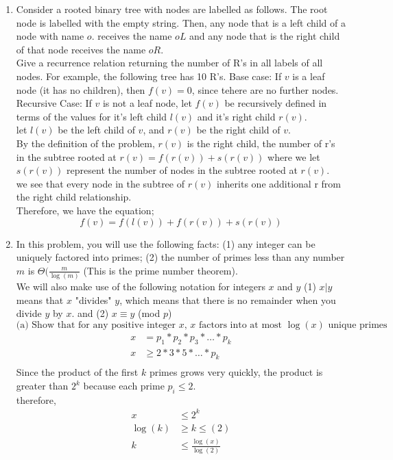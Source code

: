\documentclass{article}
\begin{document}
\begin{enumerate}
\newpage 
\item Consider a rooted binary tree with nodes are labelled as follows. The root node is labelled with the empty string. Then, any node that is a left child of a node with name $o$. receives the name $oL$ and any node that is the right child of that node receives the name $oR$. \\
Give a recurrence relation returning the number of R's in all labels of all nodes. For example, the following tree has 10 R's.
\newline 
Base case: If $v$ is a leaf node (it has no children), then $f(v) = 0$, since tehere are no further nodes. \\
Recursive Case: If $v$ is not a leaf node, let $f(v)$ be recursively defined in terms of the values for it's left child $l(v)$ and it's right child $r(v)$. \\
let $l(v)$ be the left child of $v$, and $r(v)$ be the right child of $v$. \\
By the definition of the problem, $r(v)$ is the right child, the number of r's in the subtree rooted at $r(v) = f(r(v)) + s(r(v))$ where we let $s(r(v))$ represent the number of nodes in the subtree rooted at $r(v)$. \\
we see that every node in the subtree of $r(v)$ inherits one additional r from the right child relationship. \\
Therefore, we have the equation; \\
\[
f(v) = f(l(v)) + f(r(v)) + s(r(v))
\]










\newpage 
\item In this problem, you will use the following facts: (1) any integer can be uniquely factored into primes; (2) the number of primes less than any number $m$ is $\Theta(\frac{m}{\log(m)}$ (This is the prime number theorem). \\
We will also make use of the following notation for integers $x$ and $y$ (1) $x | y$ means that $x$ "divides" $y$, which means that there is no remainder when you divide $y$ by $x$. and (2) $x \equiv y$ (mod $p$)
\[
\text{(a) Show that for any positive integer $x$, $x$ factors into at most $\log(x)$ unique primes}
\]
\begin{align*}
    x & = p_{1} * p_{2} * p_{3} * \dots * p_{k} \\
    x & \geq 2 * 3 * 5 * \dots * p_{k} \\ 
\end{align*}
Since the product of the first $k$ primes grows very quickly, the product is greater than $2^{k}$ because each prime $p_{i} \leq 2$. \\
therefore,
\begin{align*}
    x & \leq 2^{k} \\
    \log(k) & \geq k \leq(2) \\
    k & \leq \frac{\log(x)}{\log(2)}
\end{align*}






\end{enumerate}
\end{document}
